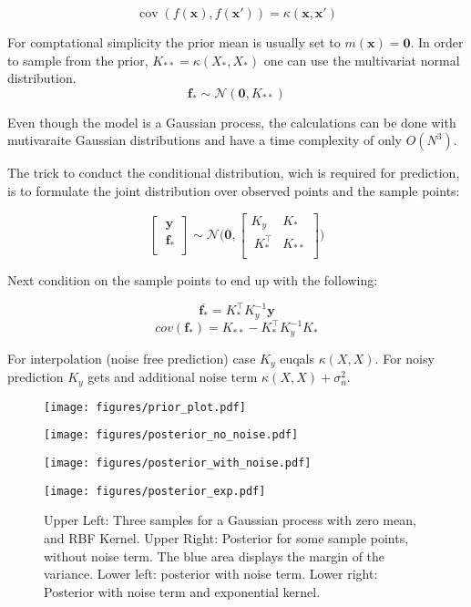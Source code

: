 \documentclass[english]{article}
\begin{document}
$$\operatorname{cov}(f(\mathbf{x}),f(\mathbf{x}')) = \kappa(\mathbf{x},\mathbf{x}')$$

For comptational simplicity the prior mean is usually set to $m(\mathbf{x}) = \mathbf{0}$. In order to sample from the prior, $K_{**} = \kappa(X_*,X_*)$ one can use the multivariat normal distribution.
$$\mathbf{f_*} \sim \mathcal{N}(\mathbf{0}, K_{**})$$

Even though the model is a Gaussian process, the calculations can be done with mutivaraite Gaussian distributions and have a time complexity of only $O(N^3)$.

The trick to conduct the conditional distribution, wich is required for prediction, is to formulate the joint distribution over observed points and the sample points:

$$
\begin{bmatrix}
\ \mathbf{y}\ \\
\ \mathbf{f_*} \\
\end{bmatrix}
\sim \mathcal{N} \Bigg(\mathbf{0},
\begin{bmatrix}
K_y & K_* \\
\ K^{\top}_{*} & K_{**}  \\
\end{bmatrix}
\Bigg)
$$

Next condition on the sample points to end up with the following:

$$\overline{\mathbf{f_*}} = K_*^\top K_y^{-1}\mathbf{y}$$
$$cov(\mathbf{f_*}) = K_{**} - K_*^\top K_y^{-1} K_*$$

For interpolation (noise free prediction) case $K_y$ euqals $\kappa(X,X)$. For noisy prediction $K_y$ gets and additional noise term $\kappa(X,X) + \sigma_n^2$.

\begin{figure}

  \begin{minipage}{0.5\textwidth}
  \texttt{[image: figures/prior\_plot.pdf]}
  \end{minipage}%
  \begin{minipage}{0.5\textwidth}
  \texttt{[image: figures/posterior\_no\_noise.pdf]}
  \end{minipage}%

  \begin{minipage}{0.5\textwidth}
  \texttt{[image: figures/posterior\_with\_noise.pdf]}
  \end{minipage}%
  \begin{minipage}{0.5\textwidth}
  \texttt{[image: figures/posterior\_exp.pdf]}
  \end{minipage}%

  \caption{Upper Left: Three samples for a Gaussian process with zero mean, and RBF Kernel. Upper Right: Posterior for some sample points, without noise term. The blue area displays the margin of the variance. Lower left: posterior with noise term. Lower right: Posterior with noise term and exponential kernel.}

\end{figure}
\end{document}
